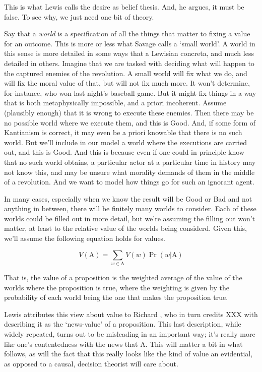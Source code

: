 This is what Lewis calls the desire as belief thesis. And, he argues, it must be false. To see why, we just need one bit of theory.

Say that a \emph{world} is a specification of all the things that matter to fixing a value for an outcome. This is more or less what Savage calls a `small world'. A world in this sense is more detailed in some ways that a Lewisian concreta, and much less detailed in others. Imagine that we are tasked with deciding what will happen to the captured enemies of the revolution. A small world will fix what we do, and will fix the moral value of that, but will not fix much more. It won't determine, for instance, who won last night's baseball game. But it might fix things in a way that is both metaphysically impossible, and a priori incoherent. Assume (plausibly enough) that it is wrong to execute these enemies. Then there may be no possible world where we execute them, and this is Good. And, if some form of Kantianism is correct, it may even be a priori knowable that there is no such world. But we'll include in our model a world where the executions are carried out, and this is Good. And this is because even if one could in principle know that no such world obtains, a particular actor at a particular time in history may not know this, and may be unsure what morality demands of them in the middle of a revolution. And we want to model how things go for such an ignorant agent.

In many cases, especially when we know the result will be Good or Bad and not anything in between, there will be finitely many worlds to consider. Each of these worlds could be filled out in more detail, but we're assuming the filling out won't matter, at least to the relative value of the worlds being considerd. Given this, we'll assume the following equation holds for values.

$$V(\text{A}) = \sum_{w \in \text{A}} V(w) \Pr(w | \text{A})$$

That is, the value of a proposition is the weighted average of the value of the worlds where the proposition is true, where the weighting is given by the probability of each world being the one that makes the proposition true.

Lewis attributes this view about value to Richard \citet{Jeffrey1965}, who in turn credits XXX with describing it as the `news-value' of a proposition. This last description, while widely repeated, turns out to be misleading in an important way; it's really more like one's contentedness with the news that A. This will matter a bit in what follows, as will the fact that this really looks like the kind of value an evidential, as opposed to a causal, decision theorist will care about.


